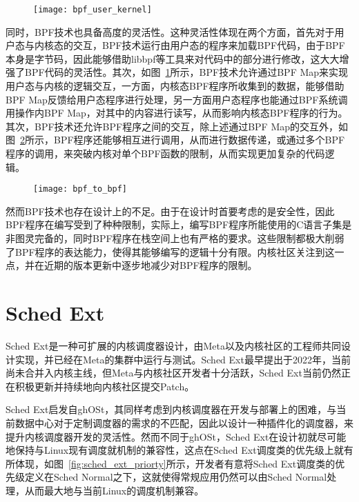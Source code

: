 \begin{figure}[!htbp]
    \centering
    \texttt{[image: bpf\_user\_kernel]}
    \label{fig:bpf_user_kernel}
\end{figure}

同时，BPF技术也具备高度的灵活性。这种灵活性体现在两个方面，首先对于用户态与内核态的交互，BPF技术运行由用户态的程序来加载BPF代码，由于BPF本身是字节码，因此能够借助libbpf等工具来对代码中的部分进行修改，这大大增强了BPF代码的灵活性。其次，如图~\ref{fig:bpf_user_kernel}所示，BPF技术允许通过BPF Map来实现用户态与内核的逻辑交互，一方面，内核态BPF程序所收集到的数据，能够借助BPF Map反馈给用户态程序进行处理，另一方面用户态程序也能通过BPF系统调用操作内BPF Map，对其中的内容进行读写，从而影响内核态BPF程序的行为。其次，BPF技术还允许BPF程序之间的交互，除上述通过BPF Map的交互外，如图~\ref{fig:bpf_to_bpf}所示，BPF程序还能够相互进行调用，从而进行数据传递，或通过多个BPF程序的调用，来突破内核对单个BPF函数的限制，从而实现更加复杂的代码逻辑。

\begin{figure}[!htbp]
    \centering
    \texttt{[image: bpf\_to\_bpf]}
    \label{fig:bpf_to_bpf}
\end{figure}

然而BPF技术也存在设计上的不足。由于在设计时首要考虑的是安全性，因此BPF程序在编写受到了种种限制，实际上，编写BPF程序所能使用的C语言子集是非图灵完备的，同时BPF程序在栈空间上也有严格的要求。这些限制都极大削弱了BPF程序的表达能力，使得其能够编写的逻辑十分有限。内核社区关注到这一点，并在近期的版本更新中逐步地减少对BPF程序的限制。

\section{Sched Ext}

Sched Ext是一种可扩展的内核调度器设计\citep{schedext}，由Meta以及内核社区的工程师共同设计实现，并已经在Meta的集群中运行与测试。Sched Ext最早提出于2022年，当前尚未合并入内核主线，但Meta与内核社区开发者十分活跃，Sched Ext当前仍然正在积极更新并持续地向内核社区提交Patch。

Sched Ext启发自ghOSt\citep{humphries2021ghost}，其同样考虑到内核调度器在开发与部署上的困难，与当前数据中心对于定制调度器的需求的不匹配，因此以设计一种插件化的调度器，来提升内核调度器开发的灵活性。然而不同于ghOSt，Sched Ext在设计初就尽可能地保持与Linux现有调度就机制的兼容性，这点在Sched Ext调度类的优先级上就有所体现，如图~\ref{fig:sched_ext_priorty}所示，开发者有意将Sched Ext调度类的优先级定义在Sched Normal之下，这就使得常规应用仍然可以由Sched Normal处理，从而最大地与当前Linux的调度机制兼容。

